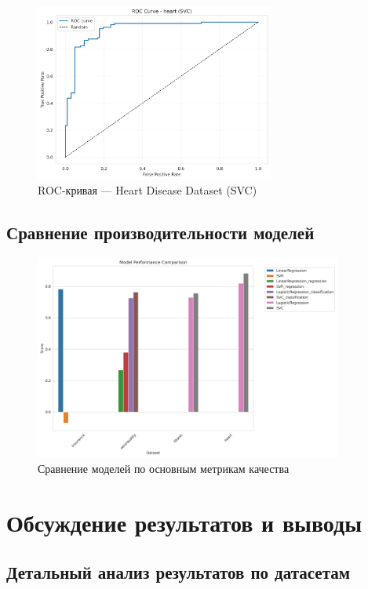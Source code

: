 \documentclass[a4paper]{article}
\begin{document}
\begin{figure}[H]
\centering
\includegraphics[width=0.7\textwidth]{images/roc_curve_heart_svc.png}
\caption{ROC-кривая — Heart Disease Dataset (SVC)}
\end{figure}

\subsection{Сравнение производительности моделей}

\begin{figure}[H]
\centering
\includegraphics[width=0.9\textwidth]{images/model_comparison.png}
\caption{Сравнение моделей по основным метрикам качества}
\end{figure}

\section{Обсуждение результатов и выводы}

\subsection{Детальный анализ результатов по датасетам}
\end{document}
